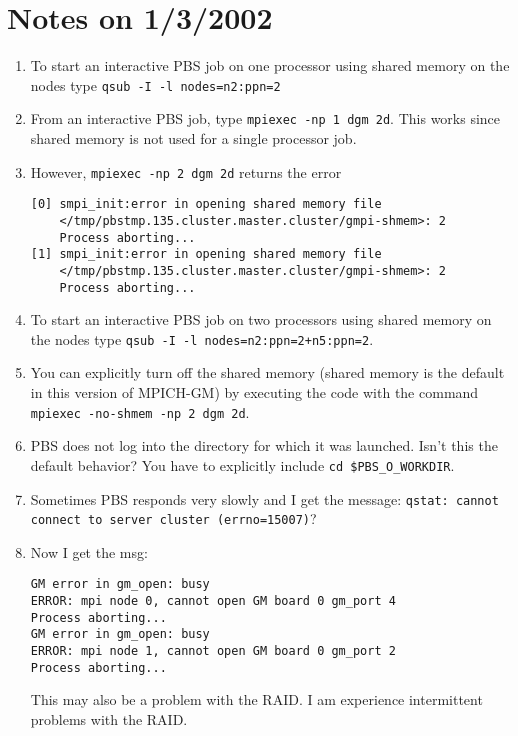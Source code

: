 \documentclass[10pt]{article}
\begin{document}
\section*{\normalsize Notes on 1/3/2002}

\begin{enumerate}

\item To start an interactive PBS job on one processor using shared memory on
the nodes type {\tt qsub -I -l nodes=n2:ppn=2}

\item From an interactive PBS job, type {\tt mpiexec -np 1 dgm 2d}.  This
works since shared memory is not used for a single processor job.

\item However, {\tt mpiexec -np 2 dgm 2d} returns the error
\begin{verbatim}
[0] smpi_init:error in opening shared memory file 
    </tmp/pbstmp.135.cluster.master.cluster/gmpi-shmem>: 2
    Process aborting...
[1] smpi_init:error in opening shared memory file 
    </tmp/pbstmp.135.cluster.master.cluster/gmpi-shmem>: 2
    Process aborting...
\end{verbatim}

\item To start an interactive PBS job on two processors using shared
memory on the nodes type {\tt qsub -I -l nodes=n2:ppn=2+n5:ppn=2}.

\item You can explicitly turn off the shared memory (shared memory is the
default in this version of MPICH-GM) by executing the code with the command
{\tt mpiexec -no-shmem -np 2 dgm 2d}.

\item PBS does not log into the directory for which it was launched.  Isn't
this the default behavior?  You have to explicitly include {\tt cd
\$PBS\_O\_WORKDIR}.

\item Sometimes PBS responds very slowly and I get the message: {\tt qstat:
cannot connect to server cluster (errno=15007)}?

\item Now I get the msg:
\begin{verbatim}
GM error in gm_open: busy
ERROR: mpi node 0, cannot open GM board 0 gm_port 4
Process aborting...
GM error in gm_open: busy
ERROR: mpi node 1, cannot open GM board 0 gm_port 2
Process aborting...
\end{verbatim}
This may also be a problem with the RAID.  I am experience intermittent
problems with the RAID.


\end{enumerate}
\end{document}
